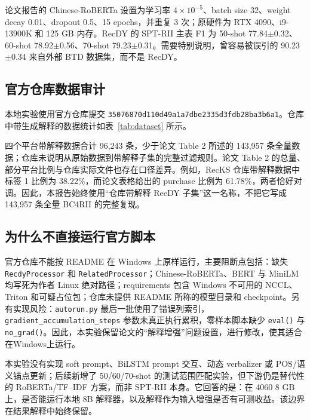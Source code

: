 \documentclass[UTF8,zihao=-4,a4paper]{ctexart}
\begin{document}
论文报告的 Chinese-RoBERTa 设置为学习率 $4\times10^{-5}$、batch size 32、weight decay 0.01、dropout 0.5、15 epochs，并重复 3 次；原硬件为 RTX 4090、i9-13900K 和 125 GB 内存。RecDY 的 SPT-RII 主表 F1 为 50-shot 77.84$\pm$0.32、60-shot 78.92$\pm$0.56、70-shot 79.23$\pm$0.31。需要特别说明，曾容易被误引的 90.23$\pm$0.34 来自外部 BTD 数据集，而不是 RecDY。

\subsection{官方仓库数据审计}

本地实验使用官方仓库提交 \texttt{35076870d110d49a1a7dbe2335d3fdb28ba3b6a1}。仓库中带生成解释的数据统计如表~\ref{tab:dataset} 所示。

\begin{table}[htbp]
\centering
\caption{官方仓库 \texttt{BC4RII\_with\_generation} 的实际行数。正类指标签 1。}
\label{tab:dataset}

\end{table}

四个平台带解释数据合计 96,243 条，少于论文 Table 2 所述的 143,957 条全量数据；仓库未说明从原始数据到带解释子集的完整过滤规则。论文 Table 2 的总量、部分平台比例与仓库实际文件也存在口径差异。例如，RecKS 仓库带解释数据中标签 1 比例为 38.22\%，而论文表格给出的 purchase 比例为 61.78\%，两者恰好对调。因此，本报告始终使用“仓库带解释 RecDY 子集”这一名称，不把它写成 143,957 条全量 BC4RII 的完整复现。

\subsection{为什么不直接运行官方脚本}

官方仓库不能按 README 在 Windows 上原样运行，主要阻断点包括：缺失 \texttt{RecdyProcessor} 和 \texttt{RelatedProcessor}；Chinese-RoBERTa、BERT 与 MiniLM 均写死为作者 Linux 绝对路径；requirements 包含 Windows 不可用的 NCCL、Triton 和可疑占位包；仓库未提供 README 所称的模型目录和 checkpoint。另有实现风险：\texttt{autorun.py} 最后一批使用了错误列索引，\texttt{gradient\_accumulation\_steps} 参数未真正执行累积，零样本脚本缺少 \texttt{eval()} 与 \texttt{no\_grad()}。因此，本实验保留论文的“解释增强”问题设置，进行修改，使其适合在Windows上运行。

\begin{riskbox}[复现边界]
本实验没有实现 soft prompt、BiLSTM prompt 交互、动态 verbalizer 或 POS/语义锚点更新；后续新增了 50/60/70-shot 的测试范围匹配实验，但下游仍是替代性的 RoBERTa/TF--IDF 方案，而非 SPT-RII 本身。它回答的是：在 4060 8 GB 上，是否能运行本地 8B 解释器，以及解释作为输入增强是否有可测收益。该边界在结果解释中始终保留。
\end{riskbox}
\end{document}
